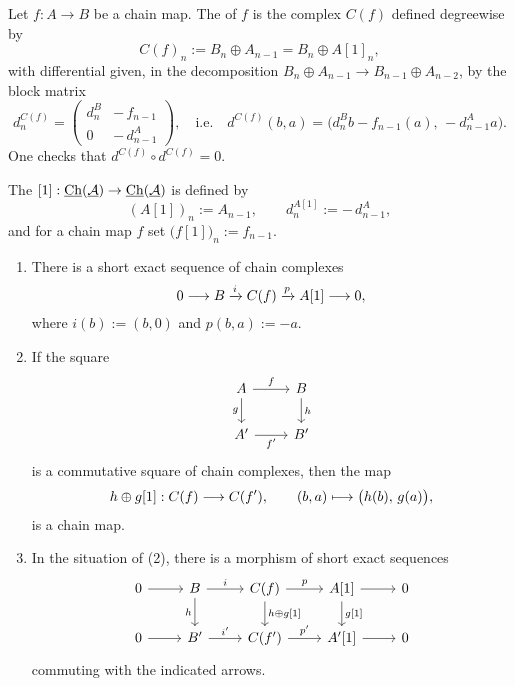 
\begin{definition*}
	Let \( f: A \to B \) be a chain map. The  of \( f \) is the complex \( C(f) \) defined degreewise by
	\[
		C(f)_n := B_n \oplus A_{n-1} = B_n \oplus A[1]_n,
	\]
	with differential given, in the decomposition \( B_n \oplus A_{n-1} \to B_{n-1} \oplus A_{n-2} \), by the block matrix
	\[
		d^{C(f)}_n =
		\begin{pmatrix}
			d^B_n & -\,f_{n-1}   \\
			0     & -\,d^A_{n-1}
		\end{pmatrix}
		,
		\quad\text{i.e.}\quad
		d^{C(f)}(b,a) = \bigl(d^B_n b - f_{n-1}(a),\,-d^A_{n - 1} a\bigr).
	\]
	One checks that \( d^{C(f)} \circ d^{C(f)} = 0 \).
\end{definition*}

\begin{remark*}
	The  \( [1]: \operatorname{\underline{\mathrm{Ch}}}(\underline{\mathcal A}) \to \operatorname{\underline{\mathrm{Ch}}}(\underline{\mathcal A}) \) is defined by
	\[
		(A[1])_n := A_{n-1}, \qquad d^{A[1]}_n := -\,d^A_{n-1},
	\]
	and for a chain map \( f \) set \( \bigl(f[1]\bigr)_n := f_{n-1} \).
\end{remark*}

\begin{proposition*}
	\mbox{}
	\begin{enumerate}
		\item There is a short exact sequence of chain complexes
			\[
				0 \longrightarrow B \xrightarrow{i} C(f) \xrightarrow{p} A[1] \longrightarrow 0,
			\]
			where \( i(b) := (b,0) \) and \( p(b,a) := -a \).
		\item If the square
			\[
				\begin{tikzcd}
					A \arrow[r,"f"] \arrow[d,"g"'] & B \arrow[d,"h"] \\
					A' \arrow[r,"f'"'] & B'
				\end{tikzcd}
			\]
			is a commutative square of chain complexes, then the map
			\[
				h \oplus g[1]: C(f) \longrightarrow C(f'), \qquad (b,a) \longmapsto \bigl(h(b),\, g(a)\bigr),
			\]
			is a chain map.
		\item In the situation of (2), there is a morphism of short exact sequences
			\[
				\begin{tikzcd}
					0 \arrow[r] & B \arrow[r,"i"] \arrow[d,"h"'] & C(f) \arrow[r,"p"] \arrow[d,"h \oplus g\lbrack1\rbrack"] & A[1] \arrow[r] \arrow[d,"g\lbrack1\rbrack"] & 0 \\
					0 \arrow[r] & B' \arrow[r,"i'"] & C(f') \arrow[r,"p'"] & A'[1] \arrow[r] & 0
				\end{tikzcd}
			\]
			commuting with the indicated arrows.
	\end{enumerate}
\end{proposition*}

